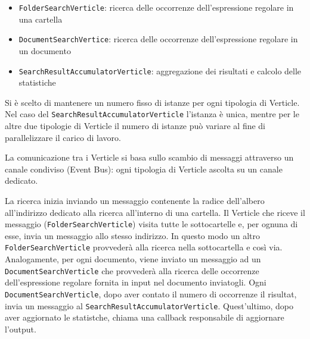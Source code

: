 \documentclass[a4paper]{article}
\begin{document}
\begin{itemize}
%
    \item \texttt{FolderSearchVerticle}: ricerca delle occorrenze dell'espressione regolare in una cartella
%
    \item \texttt{DocumentSearchVertice}: ricerca delle occorrenze dell'espressione regolare in un documento
%
    \item \texttt{SearchResultAccumulatorVerticle}: aggregazione dei risultati e calcolo delle statistiche
%
\end{itemize}

Si \`e scelto di mantenere un numero fisso di istanze per ogni tipologia di Verticle.
%
Nel caso del \texttt{SearchResultAccumulatorVerticle} l'istanza \`e unica, mentre per le altre due tipologie di Verticle il numero di istanze pu\`o variare al fine di parallelizzare il carico di lavoro.

La comunicazione tra i Verticle si basa sullo scambio di messaggi attraverso un canale condiviso (Event Bus): ogni tipologia di Verticle ascolta su un canale dedicato.

La ricerca inizia inviando un messaggio contenente la radice dell'albero all'indirizzo dedicato alla ricerca all'interno di una cartella.
%
Il Verticle che riceve il messaggio (\texttt{FolderSearchVerticle}) visita tutte le sottocartelle e, per ognuna di esse, invia un messaggio allo stesso indirizzo.
%
In questo modo un altro \texttt{FolderSearchVerticle} provveder\`a alla ricerca nella sottocartella e cos\`i via.
%
Analogamente, per ogni documento, viene inviato un messaggio ad un \texttt{DocumentSearchVerticle} che provveder\`a alla ricerca delle occorrenze dell'espressione regolare fornita in input nel documento inviatogli.
%
Ogni \texttt{DocumentSearchVerticle}, dopo aver contato il numero di occorrenze il risultat, invia un messaggio al \texttt{SearchResultAccumulatorVerticle}.
%
Quest'ultimo, dopo aver aggiornato le statistche, chiama una callback responsabile di aggiornare l'output.
\end{document}
